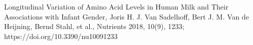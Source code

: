 \documentclass[12pt]{article}
\begin{document}
\newpage



\begin{thebibliography}{1}

 Longitudinal Variation of Amino Acid Levels in Human Milk and Their Associations with Infant Gender, Joris H. J. Van Sadelhoff, Bert J. M. Van de Heijning, Bernd Stahl, et al., Nutrients 2018, 10(9), 1233; https://doi.org/10.3390/nu10091233


\end{thebibliography}
\end{document}
